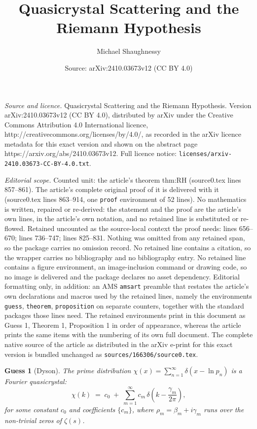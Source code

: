 \documentclass[10pt,a4paper]{amsart}
\title{Quasicrystal Scattering and the Riemann Hypothesis}
\author{Michael Shaughnessy}
\date{Source: arXiv:2410.03673v12 (CC BY 4.0)}
\newtheorem{guess}{Guess}
\begin{document}
\maketitle

\noindent\emph{Source and licence.} Quasicrystal Scattering and the Riemann Hypothesis. Version arXiv:2410.03673v12 (CC BY 4.0), distributed by arXiv under the Creative Commons Attribution 4.0 International licence, http://creativecommons.org/licenses/by/4.0/, as recorded in the arXiv licence metadata for this exact version and shown on the abstract page https://arxiv.org/abs/2410.03673v12. Full licence notice: \texttt{licenses/arxiv-2410.03673-CC-BY-4.0.txt}.\par\smallskip

\noindent\textit{Editorial scope.} Counted unit: the article's theorem thm:RH (source0.tex lines 857--861). The article's complete original proof of it is delivered with it (source0.tex lines 863--914, one \texttt{proof} environment of 52 lines). No mathematics is written, repaired or re-derived: the statement and the proof are the article's own lines, in the article's own notation, and no retained line is substituted or re-flowed.  Retained uncounted as the source-local context the proof needs: lines 656--670; lines 736--747; lines 825--831.  Nothing was omitted from any retained span, so the package carries no omission record.  No retained line contains a citation, so the wrapper carries no bibliography and no bibliography entry.  No retained line contains a figure environment, an image-inclusion command or drawing code, so no image is delivered and the package declares no asset dependency.  Editorial formatting only, in addition: an AMS \texttt{amsart} preamble that restates the article's own declarations and macros used by the retained lines, namely the environments \texttt{guess}, \texttt{theorem}, \texttt{proposition} on separate counters, together with the standard packages those lines need.  The retained environments print in this document as Guess 1, Theorem 1, Proposition 1 in order of appearance, whereas the article prints the same items with the numbering of its own full document.  The complete native source of the article as distributed in the arXiv e-print for this exact version is bundled unchanged as \texttt{sources/166306/source0.tex}.
\begin{guess}[Dyson]
\label{guess:chi}
The prime distribution
$\chi(x) = \sum_{n=1}^\infty \delta(x - \ln p_n)$
is a Fourier quasicrystal:
\begin{equation}
  \hat\chi(k)
   \;=\; c_0 \;+\; \sum_{m=1}^\infty c_m\,
                    \delta\!\left(k - \frac{\gamma_m}{2\pi}\right),
  \label{eq:guess}
\end{equation}
for some constant $c_0$ and coefficients $\{c_m\}$, where
$\rho_m = \beta_m + i\gamma_m$ runs over the non-trivial zeros
of $\zeta(s)$.
\end{guess}
\end{document}

